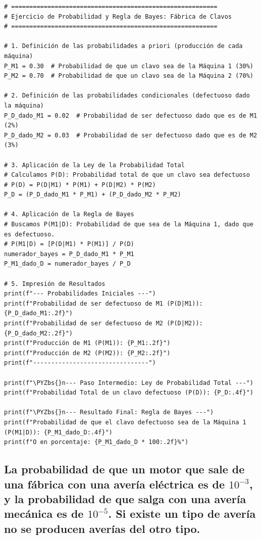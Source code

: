 \documentclass[11pt]{article}
\makeatletter
\def\PYZbs{\char`\\}
\newcommand{\boxspacing}{\kern\kvtcb@left@rule\kern\kvtcb@boxsep}
\newcommand{\prompt}[4]{
        {\ttfamily\llap{{\color{#2}[#3]:\hspace{3pt}#4}}\vspace{-\baselineskip}}
    }
\makeatother
\begin{document}
\begin{tcolorbox}[breakable, size=fbox, boxrule=1pt, pad at break*=1mm, colback=cellbackground, colframe=cellborder]
\prompt{In}{incolor}{6}{\boxspacing}
\begin{Verbatim}[commandchars=\\\{\}]
# =========================================================
# Ejercicio de Probabilidad y Regla de Bayes: Fábrica de Clavos
# =========================================================

# 1. Definición de las probabilidades a priori (producción de cada máquina)
P_M1 = 0.30  # Probabilidad de que un clavo sea de la Máquina 1 (30%)
P_M2 = 0.70  # Probabilidad de que un clavo sea de la Máquina 2 (70%)

# 2. Definición de las probabilidades condicionales (defectuoso dado la máquina)
P_D_dado_M1 = 0.02  # Probabilidad de ser defectuoso dado que es de M1 (2%)
P_D_dado_M2 = 0.03  # Probabilidad de ser defectuoso dado que es de M2 (3%)

# 3. Aplicación de la Ley de la Probabilidad Total
# Calculamos P(D): Probabilidad total de que un clavo sea defectuoso
# P(D) = P(D|M1) * P(M1) + P(D|M2) * P(M2)
P_D = (P_D_dado_M1 * P_M1) + (P_D_dado_M2 * P_M2)

# 4. Aplicación de la Regla de Bayes
# Buscamos P(M1|D): Probabilidad de que sea de la Máquina 1, dado que es defectuoso.
# P(M1|D) = [P(D|M1) * P(M1)] / P(D)
numerador_bayes = P_D_dado_M1 * P_M1
P_M1_dado_D = numerador_bayes / P_D

# 5. Impresión de Resultados
print(f"--- Probabilidades Iniciales ---")
print(f"Probabilidad de ser defectuoso de M1 (P(D|M1)): {P_D_dado_M1:.2f}")
print(f"Probabilidad de ser defectuoso de M2 (P(D|M2)): {P_D_dado_M2:.2f}")
print(f"Producción de M1 (P(M1)): {P_M1:.2f}")
print(f"Producción de M2 (P(M2)): {P_M2:.2f}")
print(f"--------------------------------")

print(f"\PYZbs{}n--- Paso Intermedio: Ley de Probabilidad Total ---")
print(f"Probabilidad Total de un clavo defectuoso (P(D)): {P_D:.4f}")

print(f"\PYZbs{}n--- Resultado Final: Regla de Bayes ---")
print(f"Probabilidad de que el clavo defectuoso sea de la Máquina 1 (P(M1|D)): {P_M1_dado_D:.4f}")
print(f"O en porcentaje: {P_M1_dado_D * 100:.2f}%")
\end{Verbatim}
\end{tcolorbox}

    \hypertarget{probabilidad}{%
\subsection{La probabilidad de que un motor que sale de una fábrica con una \textbf{avería eléctrica} es de $10^{-3}$, y la probabilidad de que salga con una \textbf{avería mecánica} es de $10^{-5}$. Si existe un tipo de avería no se producen averías del otro tipo.}\label{probabilidad}}
\end{document}
